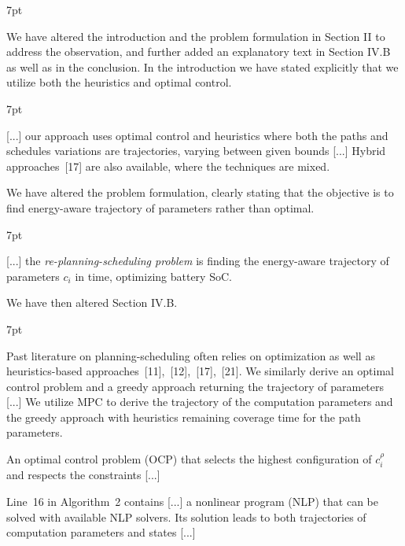\documentclass[10pt]{letter}
\newenvironment{formal}{%
  \def\FrameCommand{%
    \hspace{1pt}%
    {\color{red}\vrule width 2pt}%
    {\color{formalshade}\vrule width 4pt}%
    \colorbox{formalshade}%
  }%
  \MakeFramed{\advance\hsize-\width\FrameRestore}%
  \noindent\hspace{-4.55pt}%
  \begin{adjustwidth}{}{7pt}%
  \vspace{2pt}\vspace{2pt}%
}
{%
  \vspace{2pt}\end{adjustwidth}\endMakeFramed%
}
\begin{document}
{\begin{formal}
\begin{algorithmic}[1]
    \vspace*{.8ex}
  \end{algorithmic}
\end{formal}

  We have altered the introduction and the problem formulation in Section II to address the observation, and further added an explanatory text in Section IV.B as well as in the conclusion. In the introduction we have stated explicitly that we utilize both the heuristics and optimal control.

  \begin{formal}
  {\color{black} [...] our approach uses optimal control {\color{blue} and heuristics} where both the paths and schedules variations are trajectories, varying between given bounds [...]} Hybrid approaches~[{\color{green}17}] are also available, where the techniques are mixed.
  \vspace*{1ex}
  \end{formal}

  We have altered the problem formulation, clearly stating that the objective is to find energy-aware trajectory of parameters rather than optimal.

  \begin{formal}
    {\color{black} [...] the \emph{re-planning-scheduling problem} is finding the {\color{blue}energy-aware} trajectory of parameters $c_i$ in time{\color{blue}, optimizing battery SoC}.}
    \vspace*{1ex}
  \end{formal}

  We have then altered Section IV.B.

  \begin{formal}
  \color{black}
  Past literature on planning-scheduling often relies on %
  optimization {\color{blue} as well as heuristics-based} approaches~[{\color{green}11}],~[{\color{green}12}],~[{\color{green}17}],~[{\color{green}21}]. We similarly derive an optimal control problem {\color{blue}and a greedy approach} returning the trajectory of parameters [...] {\color{blue} We utilize MPC to derive the trajectory of the computation parameters and the greedy approach with heuristics remaining coverage time for the path parameters.}

  An optimal control problem (OCP) that selects the highest configuration of {\color{blue} $c_i^\rho$} and respects the constraints [...]

  Line~{\color{red}16} in Algorithm~{\color{red}2} contains [...] a nonlinear program (NLP) that can be solved with available NLP solvers. Its solution leads to both trajectories of {\color{blue} computation} parameters and states [...]
  

\end{formal}}
\end{document}
